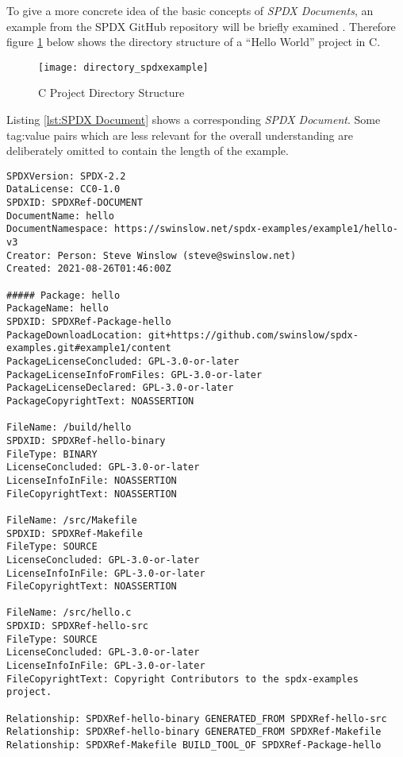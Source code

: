 \noindent
To give a more concrete idea of the basic concepts of \textit{SPDX Documents}, an example from the SPDX GitHub repository will be briefly examined \cite{SPDXExamples}. Therefore figure \ref{fig:C Project} below shows the directory structure of a \enquote{Hello World} project in C.

\begin{figure}[H]
	\centering
	\texttt{[image: directory\_spdxexample]}
	\caption[C Project Directory Structure]{C Project Directory Structure }
	\label{fig:C Project}
\end{figure}

\noindent
Listing \ref{lst:SPDX Document} shows a corresponding \textit{SPDX Document}. Some tag:value pairs which are less relevant for the overall understanding are deliberately omitted to contain the length of the example.\\ 

\noindent
\begin{lstlisting}[basicstyle=\tiny, caption=SPDX Document, captionpos=b, label=lst:SPDX Document]
SPDXVersion: SPDX-2.2
DataLicense: CC0-1.0
SPDXID: SPDXRef-DOCUMENT
DocumentName: hello
DocumentNamespace: https://swinslow.net/spdx-examples/example1/hello-v3
Creator: Person: Steve Winslow (steve@swinslow.net)
Created: 2021-08-26T01:46:00Z

##### Package: hello
PackageName: hello
SPDXID: SPDXRef-Package-hello
PackageDownloadLocation: git+https://github.com/swinslow/spdx-examples.git#example1/content
PackageLicenseConcluded: GPL-3.0-or-later
PackageLicenseInfoFromFiles: GPL-3.0-or-later
PackageLicenseDeclared: GPL-3.0-or-later
PackageCopyrightText: NOASSERTION

FileName: /build/hello
SPDXID: SPDXRef-hello-binary
FileType: BINARY
LicenseConcluded: GPL-3.0-or-later
LicenseInfoInFile: NOASSERTION
FileCopyrightText: NOASSERTION

FileName: /src/Makefile
SPDXID: SPDXRef-Makefile
FileType: SOURCE
LicenseConcluded: GPL-3.0-or-later
LicenseInfoInFile: GPL-3.0-or-later
FileCopyrightText: NOASSERTION

FileName: /src/hello.c
SPDXID: SPDXRef-hello-src
FileType: SOURCE
LicenseConcluded: GPL-3.0-or-later
LicenseInfoInFile: GPL-3.0-or-later
FileCopyrightText: Copyright Contributors to the spdx-examples project.

Relationship: SPDXRef-hello-binary GENERATED_FROM SPDXRef-hello-src
Relationship: SPDXRef-hello-binary GENERATED_FROM SPDXRef-Makefile
Relationship: SPDXRef-Makefile BUILD_TOOL_OF SPDXRef-Package-hello
\end{lstlisting}

